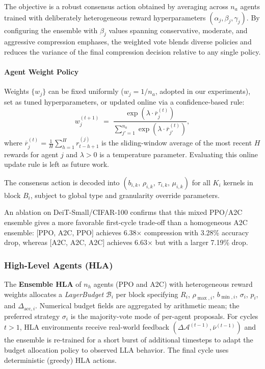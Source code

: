 \documentclass[preprint,12pt,authoryear]{elsarticle}
\begin{document}
\noindent The objective is a robust consensus action obtained by averaging across $n_a$
agents trained with deliberately heterogeneous reward hyperparameters $(\alpha_j,
\beta_j, \gamma_j)$. By configuring the ensemble with $\beta_j$ values spanning conservative, moderate,
and aggressive compression emphases, the weighted vote blends diverse policies and reduces
the variance of the final compression decision relative to any single policy.

\paragraph{Agent Weight Policy}
Weights $\{w_j\}$ can be fixed uniformly ($w_j = 1/n_a$, adopted in our experiments),
set as tuned hyperparameters, or updated online via a confidence-based rule:
\begin{equation}
    w_j^{(t+1)} \;=\; \frac{\exp\!\left(\lambda \cdot \overline{r}_j^{(t)}\right)}
                            {\displaystyle\sum_{j'=1}^{n_a}
                             \exp\!\left(\lambda \cdot \overline{r}_{j'}^{(t)}\right)},
    \label{eq:weight_update}
\end{equation}
where $\overline{r}_j^{(t)} = \frac{1}{H}\sum_{h=1}^{H} r_{t-h+1}^{(j)}$
is the sliding-window average of the most recent $H$ rewards for agent $j$ and
$\lambda > 0$ is a temperature parameter. Evaluating this online update rule is left as
future work.

The consensus action is decoded into $(b_{i,k},\,\rho_{i,k},\,\tau_{i,k},\,\mu_{i,k})$
for all $K_i$ kernels in block $B_i$, subject to global type and granularity override parameters.

An ablation on DeiT-Small/CIFAR-100 confirms that this mixed PPO/A2C ensemble gives a
more favorable first-cycle trade-off than a homogeneous A2C ensemble: [PPO, A2C, PPO]
achieves 6.38$\times$ compression with 3.28\% accuracy drop, whereas [A2C, A2C, A2C]
achieves 6.63$\times$ but with a larger 7.19\% drop.

\subsubsection{High-Level Agents (HLA)}
\label{sec:hla}

The \textbf{Ensemble HLA} of $n_h$ agents (PPO and A2C) with heterogeneous reward
weights allocates a \textit{LayerBudget} $\mathcal{B}_i$ per block specifying $R_i$,
$\rho_{\max,i}$, $b_{\min,i}$, $\sigma_i$, $p_i$, and $\Delta_{\mathrm{acc},i}$.
Numerical budget fields are aggregated by arithmetic mean; the preferred strategy
$\sigma_i$ is the majority-vote mode of per-agent proposals. For cycles $t > 1$, HLA
environments receive real-world feedback $(\Delta\mathcal{A}^{(t-1)},
\bar{\nu}^{(t-1)})$ and the ensemble is re-trained for a short burst of additional
timesteps to adapt the budget allocation policy to observed LLA behavior. The final
cycle uses deterministic (greedy) HLA actions.
\end{document}
